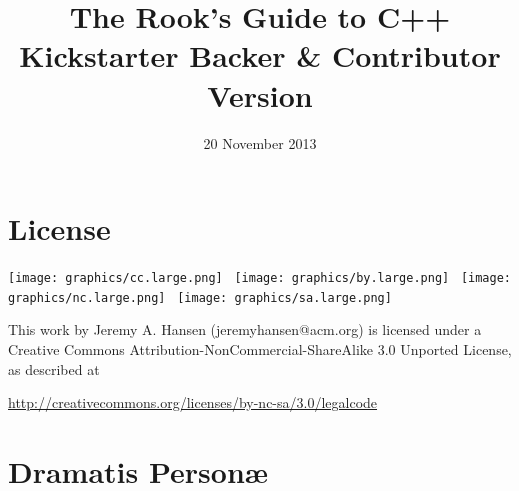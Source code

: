 \documentclass[11pt,final]{book}
\title{The Rook's Guide to C++
 \\ \small{Kickstarter Backer \& Contributor Version}
      }
\date{20 November 2013}
\begin{document}
 \maketitle
 \thispagestyle{empty}
 \newpage

 \setcounter{page}{1}
 \tableofcontents





\chapter*{License}

\vspace{1in}

\texttt{[image: graphics/cc.large.png]} \
\texttt{[image: graphics/by.large.png]} \
\texttt{[image: graphics/nc.large.png]} \
\texttt{[image: graphics/sa.large.png]}

\vspace{1in}



\noindent This work by Jeremy A. Hansen (jeremyhansen@acm.org) is licensed under a Creative Commons Attribution-NonCommercial-ShareAlike 3.0 Unported License, as described at \newline

\noindent \footnotesize \url{http://creativecommons.org/licenses/by-nc-sa/3.0/legalcode}







   \chapter*{Dramatis Person\ae}
\end{document}
